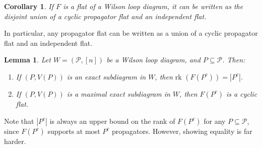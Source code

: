 \documentclass[11pt]{article}
\newcommand{\rk}{\textrm{rk }}
\newcommand{\cP}{\mathcal{P}}
\newcommand{\Prop}{\textrm{Prop}}
\newtheorem{lem}[thm]{Lemma}
\newtheorem{cor}[thm]{Corollary}
\theoremstyle{remark}
\theoremstyle{definition}
\newtheorem{dfn}[thm]{Definition}
\begin{document}
\begin{cor} \label{classifyflats}
If $F$ is a flat of a Wilson loop diagram, it can be written as the disjoint union of a cyclic propagator flat and an independent flat. \end{cor}

In particular, any propagator flat can be written as a union of a cyclic propagator flat and an independent flat.








\begin{lem} \label{maxexactcomplementrank}
Let $W = (\cP, [n])$ be a Wilson loop diagram, and $P \subseteq \cP$. Then: \begin{enumerate}
\item If $(P,V(P))$ is an exact subdiagram in $W$, then $\rk(F(P^c)) = |P^c|$.
\item If $(P,V(P))$ is a maximal exact subdiagram in $W$, then $F(P^c)$ is a cyclic flat.
\end{enumerate}
\end{lem}

Note that $|P^c|$ is always an upper bound on the rank of $F(P^c)$ for any $P \subseteq \cP$, since $F(P^c)$ supports at most $P^c$ propagators. However, showing equality is far harder.
\end{document}
